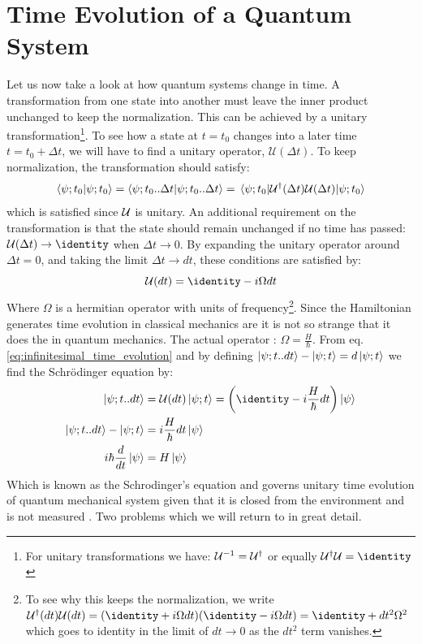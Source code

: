 \section{Time Evolution of a Quantum System}\label{sec:scroedinger}
Let us now take a look at how quantum systems change in time. A transformation from one state into another must leave the inner product unchanged to keep the normalization. This can be achieved by a unitary transformation\footnote{For unitary transformations we have: $\mathcal{U}^{-1} = \mathcal{U}^\dagger$ or equally $\unitary^\dagger\unitary = \identity$}. To see how a state at $t = t_0$ changes into a later time $t = t_0 + \Delta t$, we will have to find a unitary operator, $\mathcal{U}(\Delta t)$. To keep normalization, the transformation should satisfy:
\begin{equation}
    \braket{\psi; t_0}{\psi; t_0} = \braket{\psi; t_0 .. \Delta t}{\psi; t_0 .. \Delta t} = \mel{\psi; t_0}{\mathcal{U}^\dagger (\Delta t) \mathcal{U}(\Delta t)}{\psi; t_0} 
\end{equation}
which is satisfied since $\mathcal{U}$ is unitary. An additional requirement on the transformation is that the state should remain unchanged if no time has passed: $\unitary(\Delta t) \to \identity$ when $\Delta t \to 0$. By expanding the unitary operator around $\Delta t = 0$, and taking the limit $\Delta t \to dt$, these conditions are satisfied by:
\begin{equation}\label{eq:infinitesimal_time_evolution}
    \unitary(dt) = \identity - i \Omega dt
\end{equation}
Where $\Omega$ is a hermitian operator with units of frequency\footnote{To see why this keeps the normalization, we write $\unitary^\dagger(dt)\unitary(dt) = (\identity + i \Omega dt)(\identity - i \Omega dt) = \identity + dt^2 \Omega^2$ which goes to identity in the limit of $dt \to 0$ as the $dt^2$ term vanishes.}. 
Since the Hamiltonian generates time evolution in classical mechanics are it is not so strange that it does the in quantum mechanics. The actual operator : $\Omega = \frac{H}{\hbar}$. From eq. \ref{eq:infinitesimal_time_evolution} and by defining $\ket{\psi; t..dt} - \ket{\psi; t} = d\ket{\psi; t}$ we find the Schrödinger equation by:
\begin{align}
    \ket{\psi; t..dt} &= \unitary(dt) \ket{\psi; t} = \left(\identity - i \frac{H}{\hbar}   dt\right) \ket{\psi} \\
    \ket{\psi; t..dt} - \ket{\psi; t} &= i \frac{H}{\hbar}   dt \ket{\psi} \\
    i \hbar \frac{d}{dt}\ket{\psi} &=  H \ket{\psi}
\end{align}
Which is known as the Schrodinger's equation and governs unitary time evolution of quantum mechanical system given that it is closed from the environment and is not measured \cite{sakurai_modern_2021}. Two problems which we will return to in great detail.

